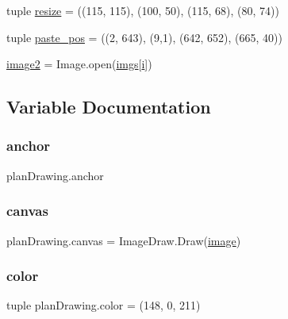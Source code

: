 \begin{DoxyCompactItemize}
\item 
tuple \mbox{\hyperlink{namespaceplan_drawing_a2f2b30547094e0b1fdc9a9b6696d0083}{resize}} = ((115, 115), (100, 50), (115, 68), (80, 74))
\item 
tuple \mbox{\hyperlink{namespaceplan_drawing_a3b90674828b47bcf73fc9253ce7e5b8e}{paste\+\_\+pos}} = ((2, 643), (9,1), (642, 652), (665, 40))
\item 
\mbox{\hyperlink{namespaceplan_drawing_ae0a78429cc8ba7006c65f1f11ec99084}{image2}} = Image.\+open(\mbox{\hyperlink{namespaceplan_drawing_a0a2455d5a72f1d606af897f753ad35b6}{imgs}}\mbox{[}\mbox{\hyperlink{namespaceplan_drawing_a9b507814fb99be9c876ea329f40fc0f1}{i}}\mbox{]})
\end{DoxyCompactItemize}


\subsection{Variable Documentation}
\mbox{\label{namespaceplan_drawing_a227f71f6f7d861c2ef06f8315e9037a7}} 
\subsubsection{\texorpdfstring{anchor}{anchor}}
{\footnotesize\ttfamily plan\+Drawing.\+anchor}

\mbox{\label{namespaceplan_drawing_a139a52c2f0375bb4e8072d73c20041e3}} 
\subsubsection{\texorpdfstring{canvas}{canvas}}
{\footnotesize\ttfamily plan\+Drawing.\+canvas = Image\+Draw.\+Draw(\mbox{\hyperlink{namespaceplan_drawing_af4e3df3fcff8b46fd59536de55f1a4c9}{image}})}

\mbox{\label{namespaceplan_drawing_a2d58998a47907d9eeb4172cb389143d8}} 
\subsubsection{\texorpdfstring{color}{color}}
{\footnotesize\ttfamily tuple plan\+Drawing.\+color = (148, 0, 211)}

